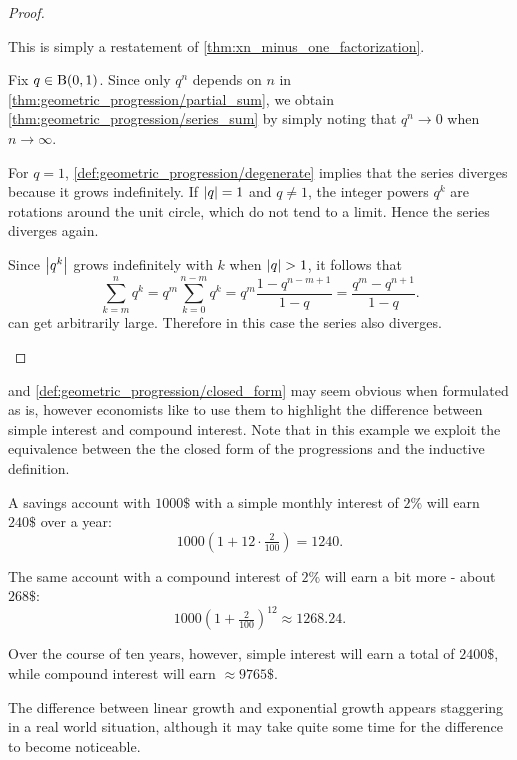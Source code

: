 \begin{proof}\mbox{}
  \begin{description}
     This is simply a restatement of \cref{thm:xn_minus_one_factorization}.

     Fix \( q \in \operatorname{B}(0, 1) \). Since only \( q^n \) depends on \( n \) in \cref{thm:geometric_progression/partial_sum}, we obtain \cref{thm:geometric_progression/series_sum} by simply noting that \( q^n \to 0 \) when \( n \to \infty \).

     For \( q = 1 \), \cref{def:geometric_progression/degenerate} implies that the series diverges because it grows indefinitely. If \( \left\vert q \right\vert = 1 \) and \( q \neq 1 \), the integer powers \( q^k \) are rotations around the unit circle, which do not tend to a limit. Hence the series diverges again.

    Since \( \left\vert q^k \right\vert \) grows indefinitely with \( k \) when \( \left\vert q \right\vert > 1 \), it follows that
    \begin{equation*}\label{thm:geometric_progression/cauchy_partial_sum}
      \sum_{k=m}^n q^k
      =
      q^m \sum_{k=0}^{n-m} q^k
      =
      q^m \frac {1 - q^{n-m+1}} {1 - q}
      =
      \frac {q^m - q^{n+1}} {1 - q}.
    \end{equation*}
    can get arbitrarily large. Therefore in this case the series also diverges.
  \end{description}
\end{proof}

\begin{remark}\label{remark:progressions_and_interest}
   and \cref{def:geometric_progression/closed_form} may seem obvious when formulated as is, however economists like to use them to highlight the difference between simple interest and compound interest. Note that in this example we exploit the equivalence between the the closed form of the progressions and the inductive definition.

  A savings account with \( 1000\$ \) with a simple monthly interest of \( 2\% \) will earn \( 240\$ \) over a year:
  \begin{equation*}
    1000 (1 + 12 \cdot \tfrac 2 {100}) = 1240.
  \end{equation*}

  The same account with a compound interest of \( 2\% \) will earn a bit more - about \( 268\$ \):
  \begin{equation*}
    1000 (1 + \tfrac 2 {100})^{12} \approx 1268.24.
  \end{equation*}

  Over the course of ten years, however, simple interest will earn a total of \( 2400\$ \), while compound interest will earn \( \approx 9765\$ \).

  The difference between linear growth and exponential growth appears staggering in a real world situation, although it may take quite some time for the difference to become noticeable.
\end{remark}

